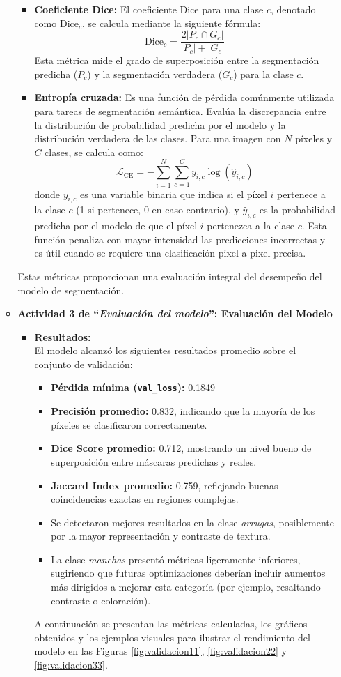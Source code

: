 \begin{enumerate}
\begin{itemize}
\begin{itemize}
  \item \textbf{Coeficiente Dice:} El coeficiente Dice para una clase $c$, denotado como $\text{Dice}_c$, se calcula mediante la siguiente fórmula:
$$\text{Dice}_c = \frac{2|P_c \cap G_c|}{|P_c| + |G_c|}$$
Esta métrica mide el grado de superposición entre la segmentación predicha ($P_c$) y la segmentación verdadera ($G_c$) para la clase $c$.
 

  \item \textbf{Entropía cruzada:} Es una función de pérdida comúnmente utilizada para tareas de segmentación semántica. Evalúa la discrepancia entre la distribución de probabilidad predicha por el modelo y la distribución verdadera de las clases. Para una imagen con $N$ píxeles y $C$ clases, se calcula como:
$$\mathcal{L}_{\text{CE}} = -\sum_{i=1}^{N} \sum_{c=1}^{C} y_{i,c} \log(\hat{y}_{i,c})$$
donde $y_{i,c}$ es una variable binaria que indica si el píxel $i$ pertenece a la clase $c$ (1 si pertenece, 0 en caso contrario), y $\hat{y}_{i,c}$ es la probabilidad predicha por el modelo de que el píxel $i$ pertenezca a la clase $c$. Esta función penaliza con mayor intensidad las predicciones incorrectas y es útil cuando se requiere una clasificación pixel a pixel precisa.
\end{itemize}

Estas métricas proporcionan una evaluación integral del desempeño del modelo de segmentación.



  \item\textbf{Actividad 3 de “\textit{Evaluación del modelo}”: Evaluación del Modelo}
  \begin{itemize}
    \item \textbf{Resultados:}\\
El modelo alcanzó los siguientes resultados promedio sobre el conjunto de validación:
\begin{itemize}
  \item \textbf{Pérdida mínima (\texttt{val\_loss}):} 0.1849 
  \item \textbf{Precisión promedio:} 0.832, indicando que la mayoría de los píxeles se clasificaron correctamente.
  \item \textbf{Dice Score promedio:} 0.712, mostrando un nivel bueno de superposición entre máscaras predichas y reales.
  \item \textbf{Jaccard Index promedio:} 0.759, reflejando buenas coincidencias exactas en regiones complejas.
  \item Se detectaron mejores resultados en la clase \emph{arrugas}, posiblemente por la mayor representación y contraste de textura.
  \item La clase \emph{manchas} presentó métricas ligeramente inferiores, sugiriendo que futuras optimizaciones deberían incluir aumentos más dirigidos a mejorar esta categoría (por ejemplo, resaltando contraste o coloración).
\end{itemize}
  A continuación se presentan las métricas calculadas, los gráficos obtenidos y los ejemplos visuales para ilustrar el rendimiento del modelo en las Figuras \ref{fig:validacion11}, \ref{fig:validacion22} y \ref{fig:validacion33}.


\end{itemize}
\end{itemize}
\end{enumerate}
